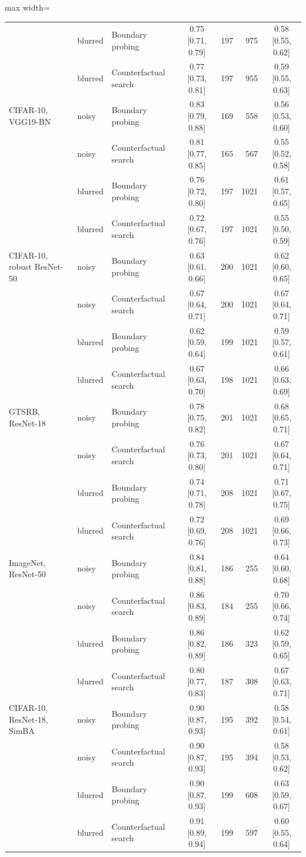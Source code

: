 \begin{table}
\begin{adjustbox}{max width=\textheight}
\begin{tabular}{lllcrrc}
 & blurred & Boundary probing & 0.75 {[}0.71, 0.79{]} & 197 & 975 & 0.58 {[}0.55, 0.62{]} \\
 & blurred & Counterfactual search & 0.77 {[}0.73, 0.81{]} & 197 & 955 & 0.59 {[}0.55, 0.63{]} \\[2pt]
CIFAR-10, VGG19-BN & noisy & Boundary probing & 0.83 {[}0.79, 0.88{]} & 169 & 558 & 0.56 {[}0.53, 0.60{]} \\
 & noisy & Counterfactual search & 0.81 {[}0.77, 0.85{]} & 165 & 567 & 0.55 {[}0.52, 0.58{]} \\
 & blurred & Boundary probing & 0.76 {[}0.72, 0.80{]} & 197 & 1021 & 0.61 {[}0.57, 0.65{]} \\
 & blurred & Counterfactual search & 0.72 {[}0.67, 0.76{]} & 197 & 1021 & 0.55 {[}0.50, 0.59{]} \\[2pt]
CIFAR-10, robust ResNet-50 & noisy & Boundary probing & 0.63 {[}0.61, 0.66{]} & 200 & 1021 & 0.62 {[}0.60, 0.65{]} \\
 & noisy & Counterfactual search & 0.67 {[}0.64, 0.71{]} & 200 & 1021 & 0.67 {[}0.64, 0.71{]} \\
 & blurred & Boundary probing & 0.62 {[}0.59, 0.64{]} & 199 & 1021 & 0.59 {[}0.57, 0.61{]} \\
 & blurred & Counterfactual search & 0.67 {[}0.63, 0.70{]} & 198 & 1021 & 0.66 {[}0.63, 0.69{]} \\[2pt]
GTSRB, ResNet-18 & noisy & Boundary probing & 0.78 {[}0.75, 0.82{]} & 201 & 1021 & 0.68 {[}0.65, 0.71{]} \\
 & noisy & Counterfactual search & 0.76 {[}0.73, 0.80{]} & 201 & 1021 & 0.67 {[}0.64, 0.71{]} \\
 & blurred & Boundary probing & 0.74 {[}0.71, 0.78{]} & 208 & 1021 & 0.71 {[}0.67, 0.75{]} \\
 & blurred & Counterfactual search & 0.72 {[}0.69, 0.76{]} & 208 & 1021 & 0.69 {[}0.66, 0.73{]} \\[2pt]
ImageNet, ResNet-50 & noisy & Boundary probing & 0.84 {[}0.81, 0.88{]} & 186 & 255 & 0.64 {[}0.60, 0.68{]} \\
 & noisy & Counterfactual search & 0.86 {[}0.83, 0.89{]} & 184 & 255 & 0.70 {[}0.66, 0.74{]} \\
 & blurred & Boundary probing & 0.86 {[}0.82, 0.89{]} & 186 & 323 & 0.62 {[}0.59, 0.65{]} \\
 & blurred & Counterfactual search & 0.80 {[}0.77, 0.83{]} & 187 & 308 & 0.67 {[}0.63, 0.71{]} \\[2pt]
CIFAR-10, ResNet-18, SimBA & noisy & Boundary probing & 0.90 {[}0.87, 0.93{]} & 195 & 392 & 0.58 {[}0.54, 0.61{]} \\
 & noisy & Counterfactual search & 0.90 {[}0.87, 0.93{]} & 195 & 394 & 0.58 {[}0.53, 0.62{]} \\
 & blurred & Boundary probing & 0.90 {[}0.87, 0.93{]} & 199 & 608 & 0.63 {[}0.59, 0.67{]} \\
 & blurred & Counterfactual search & 0.91 {[}0.89, 0.94{]} & 199 & 597 & 0.60 {[}0.55, 0.64{]} \\
\bottomrule
\end{tabular}
\end{adjustbox}
\end{table}
